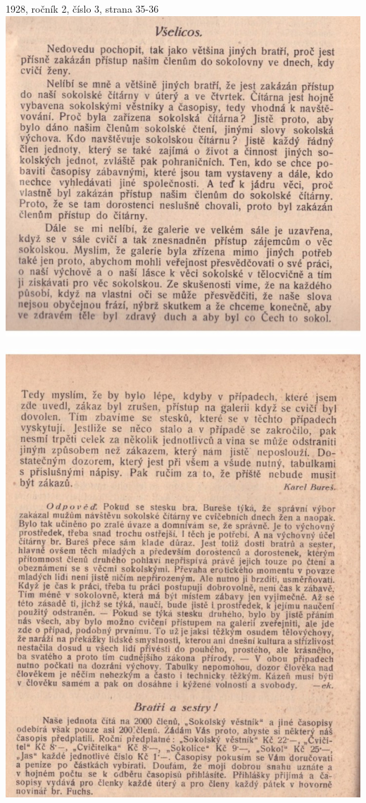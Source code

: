 \documentclass[11pt]{article}
\begin{document}
1928, ročník 2, číslo 3, strana 35-36 \\
\includegraphics[width=\imagewidth]{original/1928/Skener_20250320 (2).jpg}

\includegraphics[width=\imagewidth]{original/1928/Skener_20250320 (3).jpg}
\end{document}

